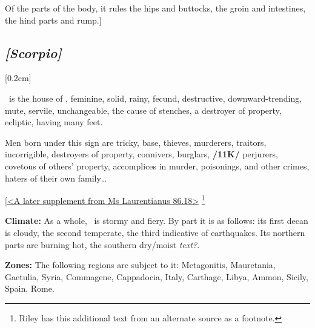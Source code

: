 Of the parts of the body, it rules the hips and buttocks, the groin and intestines, the hind parts and rump.]

\secbr
\subsection{\textit{[Scorpio]}}
[0.2cm]

 \Scorpio\, is the house of \Mars,  feminine,  solid,  rainy, fecund, destructive, downward-trending,  mute,  servile, unchangeable, the cause of stenches, a destroyer of property,  ecliptic, having many feet. 

Men born under this sign are tricky, base, thieves, murderers,  traitors,  incorrigible,  destroyers of property,  connivers, burglars, \textbf{/11K/}  perjurers,  covetous of others’ property,  accomplices in murder, poisonings, and other crimes, haters of their own family\ldots

\noindent
[\underline{<A later supplement from Ms Laurentianus 86.18>}
\footnote{Riley has this additional text from an alternate source as a footnote.}  

\textbf{Climate:} As a whole, \Scorpio\, is stormy and fiery. By part it is as follows: its first decan is cloudy, the second temperate, the third indicative of earthquakes. Its northern parts are burning hot, the southern dry/moist \textit{text?}. 

\textbf{Zones:} The following regions are subject to it:
Metagonitis, Mauretania, Gaetulia, Syria, Commagene, Cappadocia, Italy, Carthage, Libya, Ammon, Sicily, Spain, Rome. 

